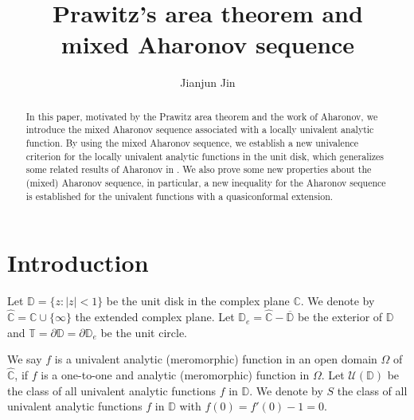 \documentclass[10pt]{amsart}
\theoremstyle{definition}
\theoremstyle{remark}
\numberwithin{equation}{section}
\begin{document}
\begin{center}
\title[Prawitz's area theorem and mixed Aharonov sequence]{Prawitz's area theorem and \\ mixed Aharonov sequence}
\end{center}

\author{Jianjun Jin}
\address{School of Mathematics Sciences, Hefei University of Technology, Xuancheng Campus, Xuancheng 242000, P.R.China}

\begin{abstract}
In this paper, motivated by the Prawitz area theorem and the work of Aharonov, we introduce the mixed Aharonov sequence associated with a locally univalent analytic function. By using the mixed Aharonov sequence, we establish a new univalence criterion for the locally univalent analytic functions in the unit disk, which generalizes some related results of Aharonov in \cite{Ah}. We also prove some new properties about the (mixed) Aharonov sequence, in particular, a new inequality for the Aharonov sequence is established for the univalent functions with a quasiconformal extension. 
\end{abstract}

\maketitle

\section{{\bf {Introduction}}}
Let $\mathbb{D}=\{z:|z|<1\}$ be the unit disk in the complex plane $\mathbb{C}$.  
We denote by $\widehat{\mathbb{C}}=\mathbb{C}\cup\{\infty\}$ the extended complex plane.  Let $\mathbb{D}_{e}=\widehat{\mathbb{C}}-\overline{\mathbb{D}}$ be the
exterior of $\mathbb{D}$ and $\mathbb{T}=\partial\mathbb{D}=\partial\mathbb{D}_e$ be the unit circle.  

We say $f$ is a univalent analytic (meromorphic) function in an open domain $\Omega$ of $\widehat{\mathbb{C}}$, if $f$ is a one-to-one and analytic (meromorphic) function in $\Omega$.  Let $\mathcal{U}(\mathbb{D})$ be the class of all univalent analytic functions $f$ in $\mathbb{D}$. We denote by $S$ the class of all univalent analytic functions $f$ in  $\mathbb{D}$ with $f(0)=f'(0)-1=0$.
\end{document}
